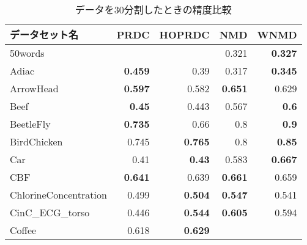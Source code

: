 \begin{longtable}{|l||r|r||r|r|}
\caption{データを30分割したときの精度比較}
\\
\hline
\textbf{データセット名} &
\multicolumn{1}{l|}{\textbf{PRDC}} &
\multicolumn{1}{l||}{\textbf{HOPRDC}} &
\multicolumn{1}{l|}{\textbf{NMD}} &
\multicolumn{1}{l|}{\textbf{WNMD}}
\bigstrut\\
\hline
\endhead
\rowcolor[rgb]{ .851,  .851,  .851} 50words &
&
&
0.321 &
\cellcolor[rgb]{ .973,  .796,  .678} \textbf{0.327}
\bigstrut\\
\hline
Adiac &
\cellcolor[rgb]{ .973,  .796,  .678} \textbf{0.459} &
0.39 &
0.317 &
\cellcolor[rgb]{ .973,  .796,  .678} \textbf{0.345}
\bigstrut\\
\hline
\rowcolor[rgb]{ .851,  .851,  .851} ArrowHead &
\cellcolor[rgb]{ .973,  .796,  .678} \textbf{0.597} &
0.582 &
\cellcolor[rgb]{ .973,  .796,  .678} \textbf{0.651} &
0.629
\bigstrut\\
\hline
Beef &
\cellcolor[rgb]{ .973,  .796,  .678} \textbf{0.45} &
0.443 &
0.567 &
\cellcolor[rgb]{ .973,  .796,  .678} \textbf{0.6}
\bigstrut\\
\hline
\rowcolor[rgb]{ .851,  .851,  .851} BeetleFly &
\cellcolor[rgb]{ .973,  .796,  .678} \textbf{0.735} &
0.66 &
0.8 &
\cellcolor[rgb]{ .973,  .796,  .678} \textbf{0.9}
\bigstrut\\
\hline
BirdChicken &
0.745 &
\cellcolor[rgb]{ .973,  .796,  .678} \textbf{0.765} &
0.8 &
\cellcolor[rgb]{ .973,  .796,  .678} \textbf{0.85}
\bigstrut\\
\hline
\rowcolor[rgb]{ .851,  .851,  .851} Car &
0.41 &
\cellcolor[rgb]{ .973,  .796,  .678} \textbf{0.43} &
0.583 &
\cellcolor[rgb]{ .973,  .796,  .678} \textbf{0.667}
\bigstrut\\
\hline
CBF &
\cellcolor[rgb]{ .973,  .796,  .678} \textbf{0.641} &
0.639 &
\cellcolor[rgb]{ .973,  .796,  .678} \textbf{0.661} &
0.659
\bigstrut\\
\hline
\rowcolor[rgb]{ .851,  .851,  .851} ChlorineConcentration &
0.499 &
\cellcolor[rgb]{ .973,  .796,  .678} \textbf{0.504} &
\cellcolor[rgb]{ .973,  .796,  .678} \textbf{0.547} &
0.541
\bigstrut\\
\hline
CinC\_ECG\_torso &
0.446 &
\cellcolor[rgb]{ .973,  .796,  .678} \textbf{0.544} &
\cellcolor[rgb]{ .973,  .796,  .678} \textbf{0.605} &
0.594
\bigstrut\\
\hline
\rowcolor[rgb]{ .851,  .851,  .851} Coffee &
0.618 &
\cellcolor[rgb]{ .973,  .796,  .678} \textbf{0.629} &

\end{longtable}
